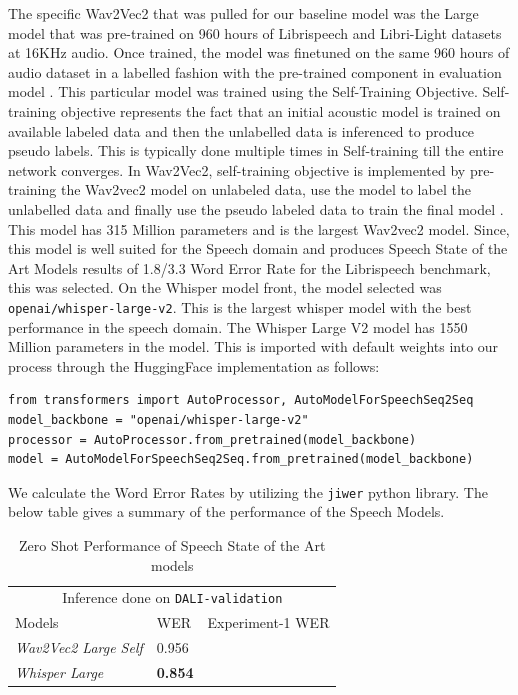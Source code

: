 The specific Wav2Vec2 that was pulled for our baseline model was the Large model that was pre-trained on 960 hours of Librispeech and Libri-Light datasets at 16KHz audio. Once trained, the model was finetuned on the same 960 hours of audio dataset in a labelled fashion with the pre-trained component in evaluation model . This particular model was trained using the Self-Training Objective. Self-training objective represents the fact that an initial acoustic model is trained on available labeled data and then the unlabelled data is inferenced to produce pseudo labels. This is typically done multiple times in Self-training till the entire network converges. In Wav2Vec2, self-training objective is implemented by pre-training the Wav2vec2 model on unlabeled data, use the model to label the unlabelled data and finally use the pseudo labeled data to train the final model \cite{xu2021self}. This model has 315 Million parameters and is the largest Wav2vec2 model. Since, this model is well suited for the Speech domain and produces Speech State of the Art Models  results of 1.8/3.3 Word Error Rate for the Librispeech benchmark, this was selected. On the Whisper model front, the model selected was \texttt{openai/whisper-large-v2}. This is the largest whisper model with the best performance in the speech domain. The Whisper Large V2 model has 1550 Million parameters in the model. This is imported with default weights into our process through the HuggingFace implementation as follows: 

\begin{verbatim}
from transformers import AutoProcessor, AutoModelForSpeechSeq2Seq
model_backbone = "openai/whisper-large-v2"
processor = AutoProcessor.from_pretrained(model_backbone)
model = AutoModelForSpeechSeq2Seq.from_pretrained(model_backbone)
\end{verbatim}

We calculate the Word Error Rates by utilizing the \texttt{jiwer} \cite{morris2004and} python library.  The below table gives a summary of the performance of the Speech Models.


\renewcommand{\arraystretch}{2}
\setlength{\arrayrulewidth}{0.3mm}
\begin{table}[H]
\small
\begin{center}
\begin{tabular}{ |p{7cm}| p{3cm}| p{4cm} | }
\multicolumn{3}{c}{Inference done on \texttt{DALI-validation}} \\
\cline{1-3}
 Models     & WER  & Experiment-1 WER \\
\hline  \hline
 \textit{Wav2Vec2 Large Self}               &                 0.956  &   \\
 \textit{Whisper Large}                     &         \textbf{0.854} & \\
\hline  \hline
\end{tabular} 
\caption{\label{zeroshot} Zero Shot Performance of Speech State of the Art  models}
\end{center}
\end{table}


